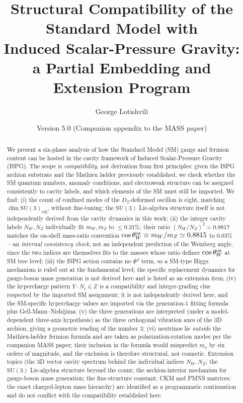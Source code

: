 \documentclass[11pt]{article}
\title{Structural Compatibility of the Standard Model with\\
Induced Scalar-Pressure Gravity:\\
a Partial Embedding and Extension Program}
\author{George Lotishvili}
\date{Version 5.0 (Companion appendix to the MASS paper)}
\begin{document}
\maketitle

\begin{abstract}
We present a six-phase analysis of how the Standard Model (SM)
gauge and fermion content can be hosted in the cavity framework
of Induced Scalar-Pressure Gravity (ISPG). The scope is
\emph{compatibility}, not derivation from first principles: given
the ISPG archion substrate and the Mathieu ladder previously
established, we check whether the SM quantum numbers, anomaly
conditions, and electroweak structure can be assigned
consistently to cavity labels, and which elements of the SM must
still be imported. We find:
(i) the count of confined modes of the $D_3$-deformed oscillon
is eight, matching $\dim\mathrm{SU}(3)_{\mathrm{adj}}$, without
fine-tuning; the $\mathrm{SU}(3)$ Lie-algebra structure itself
is not independently derived from the cavity dynamics in this
work;
(ii) the integer cavity labels $N_W,N_Z$ individually fit
$m_W,m_Z$ to $\leq 0.31\%$; their ratio $(N_W/N_Z)^2=0.8817$
matches the on-shell mass-ratio convention
$\cos\theta_W^{\rm os}\equiv m_W/m_Z\simeq0.8815$ to
$0.03\%$---an
\emph{internal consistency check}, not an independent
prediction of the Weinberg angle, since the two indices are
themselves fits to the masses whose ratio defines
$\cos\theta_W^{\rm os}$ at SM tree level;
(iii) the ISPG action contains no $\Phi^4$ term, so a SM-type
Higgs mechanism is ruled out at the fundamental level; the
specific replacement dynamics for gauge-boson mass generation
is not derived here and is listed as an extension item;
(iv) the hypercharge pattern $Y\cdot N_c\in\mathbb{Z}$ is a
compatibility and integer-grading clue respected by the imported
SM assignment; it is not independently derived here, and the
SM-specific hypercharge values are imported via the
generation-1 fitting formula plus Gell-Mann--Nishijima;
(v) the three generations are interpreted (under a
model-dependent three-axis hypothesis) as the three orthogonal
vibration axes of the 3D archion, giving a geometric reading of
the number $3$;
(vi) neutrinos lie \emph{outside} the Mathieu-ladder fermion
formula and are taken as polarization-rotation modes per the
companion MASS paper; their inclusion in the formula would
mispredict $m_\nu$ by six orders of magnitude, and the
exclusion is therefore structural, not cosmetic.
Extension topics (the 3D vector cavity spectrum behind the
individual indices $N_W,N_Z$; the $\mathrm{SU}(3)$ Lie-algebra
structure beyond the count; the archion-interior mechanism for
gauge-boson mass generation; the fine-structure constant;
CKM and PMNS matrices; the exact charged-lepton mass
hierarchy) are identified as a programmatic continuation and
do not conflict with the compatibility established here.
\end{abstract}
\end{document}
